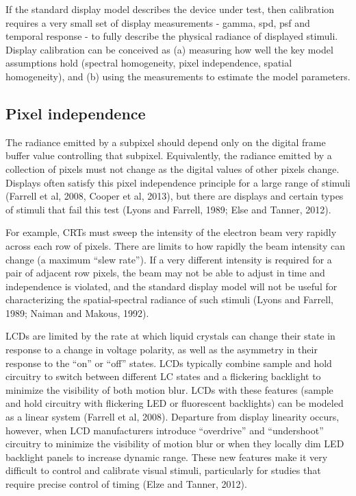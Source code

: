 \documentclass[
  letterpaper,
]{book}
\begin{document}
If the standard display model describes the device under test, then
calibration requires a very small set of display measurements - gamma,
spd, psf and temporal response - to fully describe the physical radiance
of displayed stimuli. Display calibration can be conceived as (a)
measuring how well the key model assumptions hold (spectral homogeneity,
pixel independence, spatial homogeneity), and (b) using the measurements
to estimate the model parameters.

\subsection{Pixel independence}\label{pixel-independence}

The radiance emitted by a subpixel should depend only on the digital
frame buffer value controlling that subpixel. Equivalently, the radiance
emitted by a collection of pixels must not change as the digital values
of other pixels change. Displays often satisfy this pixel independence
principle for a large range of stimuli (Farrell et al, 2008, Cooper et
al, 2013), but there are displays and certain types of stimuli that fail
this test (Lyons and Farrell, 1989; Else and Tanner, 2012).

For example, CRTs must sweep the intensity of the electron beam very
rapidly across each row of pixels. There are limits to how rapidly the
beam intensity can change (a maximum ``slew rate''). If a very different
intensity is required for a pair of adjacent row pixels, the beam may
not be able to adjust in time and independence is violated, and the
standard display model will not be useful for characterizing the
spatial-spectral radiance of such stimuli (Lyons and Farrell, 1989;
Naiman and Makous, 1992).

LCDs are limited by the rate at which liquid crystals can change their
state in response to a change in voltage polarity, as well as the
asymmetry in their response to the ``on'' or ``off'' states. LCDs
typically combine sample and hold circuitry to switch between different
LC states and a flickering backlight to minimize the visibility of both
motion blur. LCDs with these features (sample and hold circuitry with
flickering LED or fluorescent backlights) can be modeled as a linear
system (Farrell et al, 2008). Departure from display linearity occurs,
however, when LCD manufacturers introduce ``overdrive'' and
``undershoot'' circuitry to minimize the visibility of motion blur or
when they locally dim LED backlight panels to increase dynamic range.
These new features make it very difficult to control and calibrate
visual stimuli, particularly for studies that require precise control of
timing (Elze and Tanner, 2012).
\end{document}
